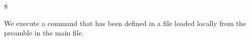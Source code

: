 \documentclass[../main.tex]{subfiles}
\begin{document}
8



We execute a command that has been defined in a file loaded locally
from the preamble in the main file.

\mycmd


\end{document}
